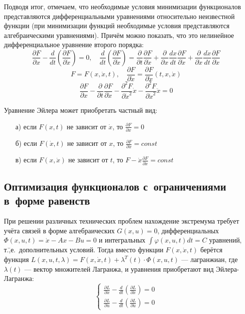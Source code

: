 \documentclass[preprint,russian,a5paper,10pt,twoside,mediummath]{ncc}
\begin{document}
Подводя итог, отмечаем, что необходимые условия минимизации функционалов представляются дифференциальными уравнениями относительно неизвестной функции (при минимизации функций не\-обходимые условия представляются алгебраическими уравнениями). Причём можно показать, что это нелинейное дифференциальное ура\-в\-нение второго порядка:
\[ \frac{\partial F}{\partial x}-\frac{d}{dt}\left( \frac{\partial F}{\partial \dot{x}} \right)=0, \quad \frac{d}{dt}\left( \frac{\partial F}{\partial \dot{x}} \right)=\frac{\partial }{\partial t}\frac{\partial F}{\partial \dot{x}} + \frac{\partial }{\partial x} \frac{dx}{dt} \frac{\partial F}{\partial \dot{x}} + \frac{\partial }{\partial \dot{x}} \frac{d\dot{x}}{dt} \frac{\partial F}{\partial \dot{x}} \]
\[ F = F\left( x, \dot{x}, t \right) ,\quad \frac{\partial F}{\partial \dot{x}}=\frac{\partial F}{\partial \dot{x}}\left( t,x,\dot{x} \right) \]
\[ \frac{\partial F}{\partial x} - \frac{\partial }{\partial t} \frac{\partial F}{\partial \dot{x}} - \frac{\partial ^2 F}{\partial \dot{x} ^2}\dot{x} - \frac{{{\partial }^{2}}F}{\partial {{{\dot{x}}}^{2}}}\ddot{x} = 0 \]

Уравнение Эйлера может приобретать частный вид:
\begin{enumerate}
\item[а)] если $ F\left( x,t \right) $ не зависит от $\dot{x}$, то $\frac{\partial F}{\partial x}=0$
\item[б)] если $F\left( \dot{x},t \right)$ не зависит от $x$, то $\frac{\partial F}{\partial \dot{x}}=const$ 
\item[в)] если $F\left( x,\dot{x} \right)$ не зависит от $t$, то $ F - \dot{x} \frac{\partial F}{\partial \dot{x}} = const $
\end{enumerate}

\vspace{\baselineskip}
	\subsection{Оптимизация функционалов с~ограничениями в~форме равенств\label{variations:conditional_extremum}}

При решении различных технических проблем нахождение экстремума требует учёта связей в форме алгебраических $ G(x,u)=0 $, дифференциальных $ \Phi (x,u,t) = \dot{x} - Ax - Bu = 0 $ и интегральных $ \int\varphi (x,u,t)dt = C $ уравнений, т.\=,е.~дополнительных условий. Тогда вместо функции $F\left( x, \dot{x}, t \right)$ берётся функция $L\left( x,u,t,\lambda  \right)=F\left( x,\dot{x},t \right) + \lambda ^T (t) \cdot \Phi \left( x,u,t \right)$ --- лагранжиан, где $ \lambda (t) $ --- вектор множителей Лагранжа, и уравнения приобретают вид Эйлера-Лагранжа:
\begin{equation}
\left\{ \begin{array}{l}
	\frac{\partial L}{\partial x} - \frac{d}{dt} \left( \frac{\partial L}{\partial \dot{x}} \right) = 0 \\[2ex]
	\frac{\partial L}{\partial u} - \frac{d}{dt} \left( \frac{\partial L}{\partial \dot{u}} \right) = 0
\end{array} \right.
\end{equation}
\end{document}
